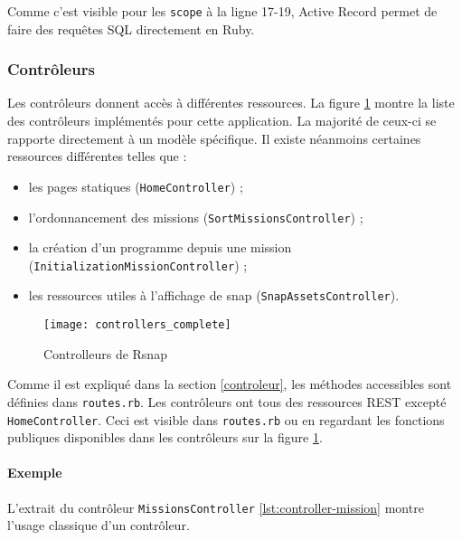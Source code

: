 Comme c'est visible pour les \lstinline[language=Rails]{scope} à la ligne 17-19, Active Record permet de faire des requêtes SQL directement en Ruby.
\begin{figure}

\end{figure}

\subsubsection{Contrôleurs}
Les contrôleurs donnent accès à différentes ressources. La figure \ref{fig:controllers} montre la liste des contrôleurs implémentés pour cette application. La majorité de ceux-ci se rapporte directement à un modèle spécifique. Il existe néanmoins certaines ressources différentes telles que :
\begin{itemize}
  \item les pages statiques (\texttt{HomeController}) ;
  \item l'ordonnancement des missions (\texttt{SortMissionsController}) ;
  \item la création d'un programme depuis une mission (\texttt{InitializationMissionController}) ;
  \item les ressources utiles à l'affichage de \gls{snap} (\texttt{SnapAssetsController}).
\end{itemize}

\begin{figure}
 \begin{center}
   \texttt{[image: controllers\_complete]}
   \caption{Controlleurs de Rsnap}
   \label{fig:controllers}
 \end{center}
\end{figure}

Comme il est expliqué dans la section \ref{controleur}, les méthodes accessibles sont définies dans \texttt{routes.rb}. Les contrôleurs ont tous des ressources REST excepté \texttt{HomeController}. Ceci est visible dans \texttt{routes.rb} ou en regardant les fonctions publiques disponibles dans les contrôleurs sur la figure \ref{fig:controllers}.

\paragraph{Exemple}
L'extrait du contrôleur \texttt{MissionsController} \ref{lst:controller-mission} montre l'usage classique d'un contrôleur.

